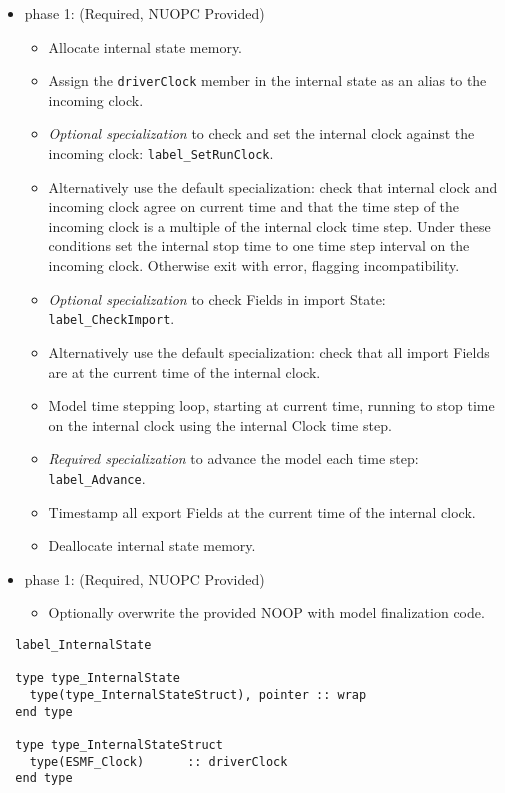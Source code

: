 \begin{itemize}
\item phase 1: ({\sc Required, NUOPC Provided})
  \begin{itemize}
  \item Allocate internal state memory.
  \item Assign the {\tt driverClock} member in the internal state as an alias to the incoming clock.
  \item {\it Optional specialization} to check and set the internal clock against the incoming clock: {\tt label\_SetRunClock}.
  \item Alternatively use the default specialization: check that internal clock and incoming clock agree on current time and that the time step of the incoming clock is a multiple of the internal clock time step. Under these conditions set the internal stop time to one time step interval on the incoming clock. Otherwise exit with error, flagging incompatibility.
  \item {\it Optional specialization} to check Fields in import State: {\tt label\_CheckImport}.
  \item Alternatively use the default specialization: check that all import Fields are at the current time of the internal clock.
  \item Model time stepping loop, starting at current time, running to stop time on the internal clock using the internal Clock time step.
  \item {\it Required specialization} to advance the model each time step: {\tt label\_Advance}.
  \item Timestamp all export Fields at the current time of the internal clock.
  \item Deallocate internal state memory.
  \end{itemize}    
\end{itemize}

\begin{itemize}
\item phase 1: ({\sc Required, NUOPC Provided})
  \begin{itemize}
  \item Optionally overwrite the provided NOOP with model finalization code.
  \end{itemize}      
\end{itemize}

\begin{verbatim}  label_InternalState

  type type_InternalState
    type(type_InternalStateStruct), pointer :: wrap
  end type

  type type_InternalStateStruct
    type(ESMF_Clock)      :: driverClock
  end type

\end{verbatim}

